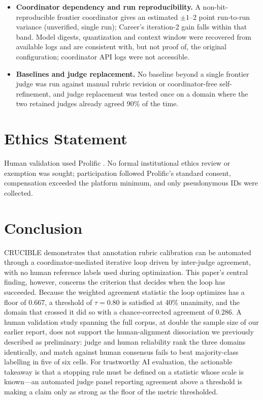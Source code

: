 \documentclass[letterpaper]{article}
\begin{document}
\begin{itemize}
\item \textbf{Coordinator dependency and run reproducibility.} A
      non-bit-reproducible frontier coordinator gives an estimated $\pm 1$--2
      point run-to-run variance (unverified, single run); Career's iteration-2
      gain falls within that band. Model digests, quantization and context
      window were recovered from available logs and are consistent with, but
      not proof of, the original configuration; coordinator API logs were not
      accessible.
\item \textbf{Baselines and judge replacement.} No baseline beyond a single
      frontier judge was run against manual rubric revision or coordinator-free
      self-refinement, and judge replacement was tested once on a domain where
      the two retained judges already agreed 90\% of the time.

\end{itemize}

\section{Ethics Statement}

Human validation used Prolific \citep{palan2018prolific}. No formal
institutional ethics review or exemption was sought; participation followed
Prolific's standard consent, compensation exceeded the platform minimum, and only
pseudonymous IDs were collected.

\section{Conclusion}

CRUCIBLE demonstrates that annotation rubric calibration can be automated
through a coordinator-mediated iterative loop driven by inter-judge
agreement, with no human reference labels used during optimization. This
paper's central finding, however, concerns the criterion that decides when the
loop has succeeded. Because the weighted agreement statistic the loop optimizes
has a floor of $0.667$, a threshold of $\tau = 0.80$ is satisfied at 40\%
unanimity, and the domain that crossed it did so with a chance-corrected
agreement of $0.286$. A human validation study spanning the full corpus, at double the sample size
of our earlier report, does not support the human-alignment dissociation we
previously described as preliminary: judge and human reliability rank the
three domains identically, and match against human consensus fails to beat
majority-class labelling in five of six cells. For trustworthy AI evaluation,
the actionable takeaway is that a stopping rule must be defined on a statistic
whose scale is known---an automated judge panel reporting agreement above a
threshold is making a claim only as strong as the floor of the metric
thresholded.
\end{document}
